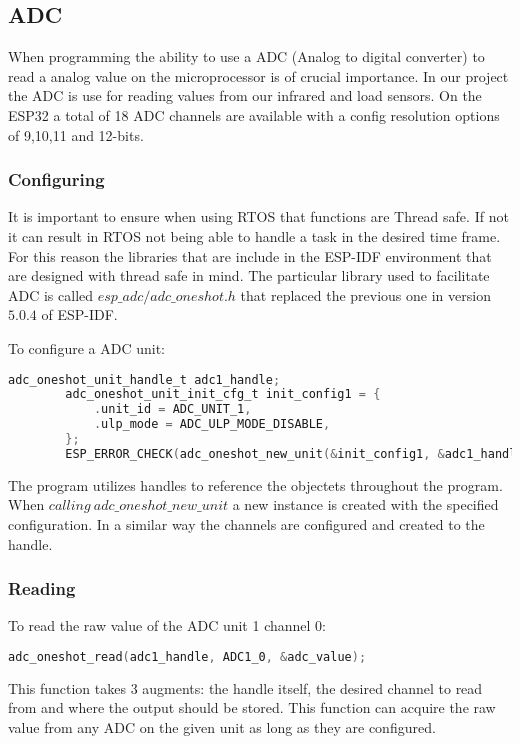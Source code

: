 \documentclass[../report.tex]{subfiles}
\begin{document}
    \subsection{ADC}
    When programming the ability to use a ADC (Analog to digital converter) to
    read a analog value on the microprocessor is of crucial importance. In our
    project the ADC is use for reading values from our infrared and load
    sensors. On the ESP32 a total of 18 ADC channels are available with a config
    resolution options of 9,10,11 and 12-bits.
    \subsubsection{Configuring}
    It is important to ensure when using RTOS that functions are Thread safe. If
    not it can result in RTOS not being able to handle a task in the desired
    time frame. For this reason the libraries that are
    include in the ESP-IDF environment that are designed with thread safe in
    mind. The particular library used to facilitate ADC is called
    $esp\_adc/adc\_oneshot.h$ that replaced the previous one in version $5.0.4$ of
    ESP-IDF. 

    To configure a ADC unit:
    \begin{lstlisting}[language=c, caption={Configuring ADC unit 1}]
        adc_oneshot_unit_handle_t adc1_handle;
        adc_oneshot_unit_init_cfg_t init_config1 = {
            .unit_id = ADC_UNIT_1,
            .ulp_mode = ADC_ULP_MODE_DISABLE,
        };
        ESP_ERROR_CHECK(adc_oneshot_new_unit(&init_config1, &adc1_handle));
    \end{lstlisting}

    The program utilizes handles to reference the objectets throughout the
    program. When $calling\ adc\_oneshot\_new\_unit$ a new instance is created with
    the specified configuration. In a similar way the channels are configured
    and created to the handle.
    \subsubsection{Reading}
    To read the raw value of the ADC unit 1 channel 0:
    \begin{lstlisting}[language=c, caption={Readning ADC unit 1 channel 0}]
        adc_oneshot_read(adc1_handle, ADC1_0, &adc_value);
    \end{lstlisting}
    This function takes 3 augments: the handle itself, the desired channel to
    read from and where the output should be stored.
    This function can acquire the raw value from any ADC on the given unit as
    long as they are configured.
\end{document}
